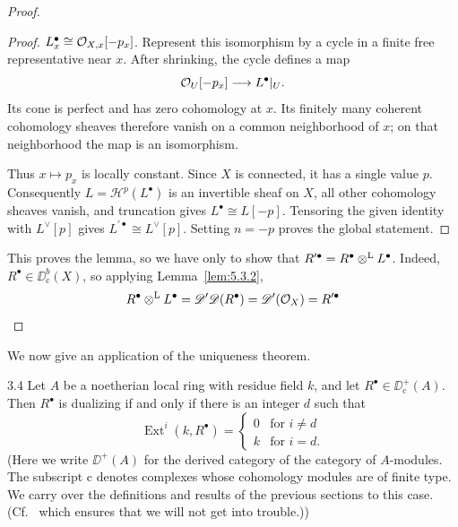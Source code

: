 \begin{proof}
\begin{proof}
{$L_x^\bullet\cong\mathcal{O}_{X,x}[-p_x]$.
Represent this isomorphism by a cycle in a finite free representative near $x$. After shrinking, the cycle defines a map
\[
\mathcal{O}_U[-p_x]\longrightarrow L^\bullet|_U.
\]
Its cone is perfect and has zero cohomology at $x$. Its finitely many coherent cohomology sheaves therefore vanish on a common neighborhood of $x$; on that neighborhood the map is an isomorphism.\par
Thus $x\mapsto p_x$ is locally constant. Since $X$ is connected, it has a single value $p$. Consequently $L=\mathcal{H}^p(L^\bullet)$ is an invertible sheaf on $X$, all other cohomology sheaves vanish, and truncation gives $L^\bullet\cong L[-p]$. Tensoring the given identity with $L^\vee[p]$ gives $L^{\prime\bullet}\cong L^\vee[p]$. Setting $n=-p$ proves the global statement.}
\end{proof}

This proves the lemma, so we have only to show that $R^{\prime\bullet} = R^\bullet\mathbin{\otimes^{\mathrm{L}}} L^{\bullet}$. Indeed, $R^\bullet\in\DD^b_{\mathrm{c}}(X)$, so applying Lemma~\ref{lem:5.3.2},
\[
R^{\bullet}\mathbin{\otimes^{\mathrm{L}}} L^{\bullet} = \mathscr{D}'\mathscr{D}(R^{\bullet}) = \mathscr{D}'(\mathcal{O}_X) = R^{\prime\bullet}
\]
\end{proof}

We now give an application of the uniqueness theorem.

\begin{bookproposition}{3.4}\label{prop:5.3.4}
Let $A$ be a noetherian local ring with residue field $k$, and let $R^\bullet\in\DD^+_{\mathrm{c}}(A)$. Then $R^\bullet$ is dualizing if and only if there is an integer $d$ such that
\[
\operatorname{Ext}^{i}(k,R^{\bullet}) = \begin{cases} 0 & \text{for } i\neq d \\ k & \text{for } i = d. \end{cases}
\]
(Here we write $\DD^+(A)$ for the derived category of the category of $A$-modules. The subscript $\mathrm{c}$ denotes complexes whose cohomology modules are of finite type. We carry over the definitions and results of the previous sections to this case. (Cf.\  which ensures that we will not get into trouble.))
\end{bookproposition}


